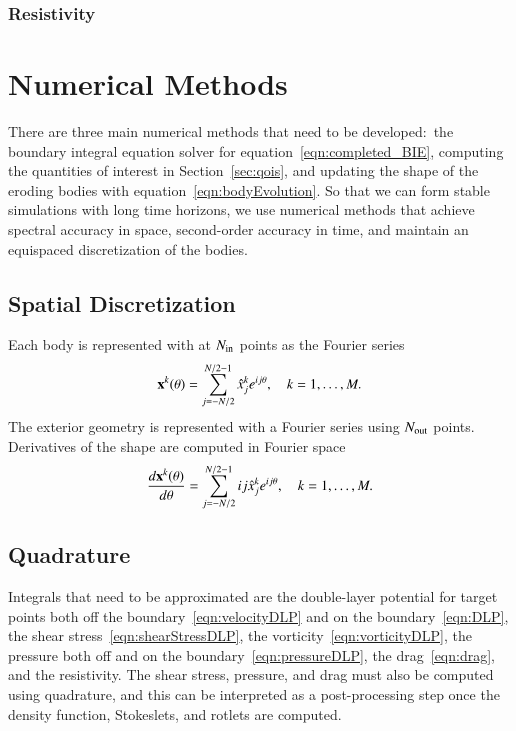 \documentclass[preprint, 10pt]{elsarticle}
\begin{document}
\subsubsection{Resistivity}



\section{Numerical Methods\label{s:method}} 
There are three main numerical methods that need to be developed:~the
boundary integral equation solver for
equation~\eqref{eqn:completed_BIE}, computing the quantities of interest
in Section~\ref{sec:qois}, and updating the shape of the eroding bodies
with equation~\eqref{eqn:bodyEvolution}.  So that we can form stable
simulations with long time horizons, we use numerical methods that
achieve spectral accuracy in space, second-order accuracy in time, and
maintain an equispaced discretization of the bodies.


\subsection{Spatial Discretization}
Each body is represented with at $N_{\mathrm{in}}$ points as the Fourier series
\begin{align*}
  {\mathbf{x}}^k(\theta) = \sum_{j = -N/2}^{N/2-1} \hat{x}_j^k e^{ij\theta},
    \quad k=1,\ldots,M.
\end{align*}
The exterior geometry is represented with a Fourier series using
$N_{\mathrm{out}}$ points.  Derivatives of the shape are computed in Fourier space
\begin{align*}
  \frac{d{\mathbf{x}}^k(\theta)}{d\theta} = 
    \sum_{j = -N/2}^{N/2-1} ij\hat{x}_j^k e^{ij\theta},
    \quad k=1,\ldots,M.
\end{align*}


\subsection{Quadrature} 
Integrals that need to be approximated are the double-layer potential
for target points both off the boundary~\eqref{eqn:velocityDLP} and on
the boundary~\eqref{eqn:DLP}, the shear
stress~\eqref{eqn:shearStressDLP}, the
vorticity~\eqref{eqn:vorticityDLP}, the pressure both off and on the
boundary~\eqref{eqn:pressureDLP}, the drag~\eqref{eqn:drag}, and the
resistivity.   The shear stress, pressure, and drag must also be
computed using quadrature, and this can be interpreted as a
post-processing step once the density function, Stokeslets, and rotlets
are computed.
\end{document}
